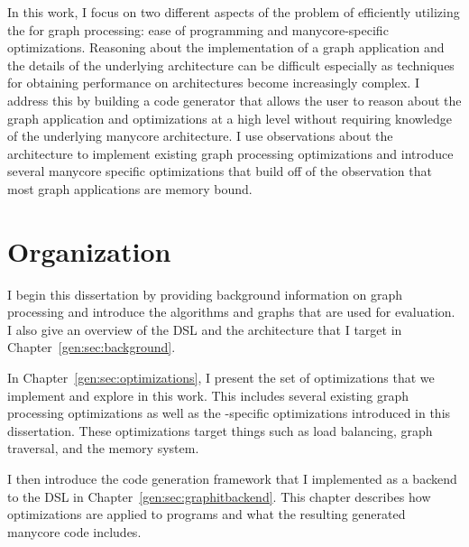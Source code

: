 In this work, I focus on two different aspects of the problem of efficiently utilizing the \hbmc for graph processing: ease of programming and manycore-specific optimizations. 
Reasoning about the implementation of a graph application and the details of the underlying architecture can be difficult especially as techniques for obtaining performance on architectures become increasingly complex. 
I address this by building a code generator that allows the user to reason about the graph application and optimizations at a high level without requiring knowledge of the underlying manycore architecture.
I use observations about the \hb architecture to implement existing graph processing optimizations and introduce several manycore specific optimizations that build off of the observation that most graph applications are memory bound. 


\section{Organization}

I begin this dissertation by providing background information on graph processing and introduce the algorithms and graphs that are used for evaluation.
I also give an overview of the \graphit DSL and the \hbmc architecture that I target in Chapter~\ref{gen:sec:background}.

In Chapter~\ref{gen:sec:optimizations}, I present the set of optimizations that we implement and explore in this work.
This includes several existing graph processing optimizations as well as the \hbmc-specific optimizations introduced in this dissertation.
These optimizations target things such as load balancing, graph traversal, and the \hb memory system. 

I then introduce the code generation framework that I implemented as a backend to the \graphit DSL in Chapter~\ref{gen:sec:graphitbackend}.
This chapter describes how optimizations are applied to programs and what the resulting generated manycore code includes.

